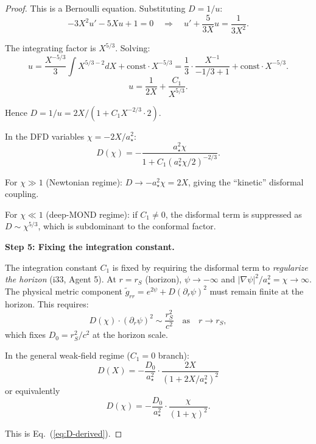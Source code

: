 \documentclass[11pt,a4paper]{article}
\begin{document}
\begin{proof}
This is a Bernoulli equation. Substituting $D = 1/u$:
\begin{equation}
-3X^2 u' - 5Xu + 1 = 0 \quad\Rightarrow\quad u' + \frac{5}{3X}u = \frac{1}{3X^2}.
\end{equation}

The integrating factor is $X^{5/3}$. Solving:
\begin{equation}
u = \frac{X^{-5/3}}{3}\int X^{5/3-2}dX + \text{const}\cdot X^{-5/3} = \frac{1}{3}\cdot\frac{X^{-1}}{-1/3+1} + \text{const}\cdot X^{-5/3}.
\end{equation}
\begin{equation}
u = \frac{1}{2X} + \frac{C_1}{X^{5/3}}.
\end{equation}

Hence $D = 1/u = 2X/(1 + C_1 X^{-2/3} \cdot 2)$.

In the DFD variables $\chi = -2X/a_\star^2$:
\begin{equation}
D(\chi) = -\frac{a_\star^2\chi}{1 + C_1(a_\star^2\chi/2)^{-2/3}}.
\end{equation}

For $\chi \gg 1$ (Newtonian regime): $D \to -a_\star^2\chi = 2X$, giving the ``kinetic'' disformal coupling.

For $\chi \ll 1$ (deep-MOND regime): if $C_1 \neq 0$, the disformal term is suppressed as $D \sim \chi^{5/3}$, which is subdominant to the conformal factor.

\textbf{Step 5: Fixing the integration constant.}

The integration constant $C_1$ is fixed by requiring the disformal term to \emph{regularize the horizon} (i33, Agent 5). At $r = r_S$ (horizon), $\psi \to -\infty$ and $|\nabla\psi|^2/a_\star^2 = \chi \to \infty$. The physical metric component $\tilde{g}_{rr} = e^{2\psi} + D(\partial_r\psi)^2$ must remain finite at the horizon. This requires:
\begin{equation}
D(\chi) \cdot (\partial_r\psi)^2 \sim \frac{r_S^2}{c^2} \quad\text{as}\quad r \to r_S,
\end{equation}
which fixes $D_0 = r_S^2/c^2$ at the horizon scale.

In the general weak-field regime ($C_1 = 0$ branch):
\begin{equation}
D(X) = -\frac{D_0}{a_\star^2}\cdot\frac{2X}{(1 + 2X/a_\star^2)^2}
\end{equation}
or equivalently
\begin{equation}
D(\chi) = -\frac{D_0}{a_\star^2}\cdot\frac{\chi}{(1+\chi)^2}.
\end{equation}

This is Eq.~(\ref{eq:D-derived}).
\end{proof}
\end{document}
